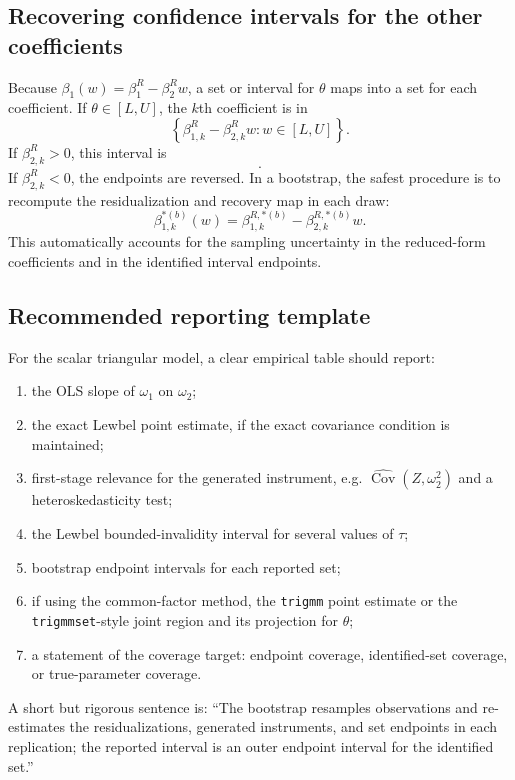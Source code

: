 \documentclass[11pt]{article}
\newcommand{\Cov}{\operatorname{Cov}}
\theoremstyle{plain}
\theoremstyle{definition}
\theoremstyle{remark}
\begin{document}
\subsection{Recovering confidence intervals for the other coefficients}
\label{subsec:other-coefficients-inference}

Because $\beta_1(w)=\beta_1^R-\beta_2^Rw$, a set or interval for $\theta$ maps
into a set for each coefficient.  If $\theta\in[L,U]$, the $k$th coefficient is
in
\begin{equation}
\left\{\beta_{1,k}^R-\beta_{2,k}^R w:w\in[L,U]\right\}.
\end{equation}
If $\beta_{2,k}^R>0$, this interval is
\begin{equation}
[\beta_{1,k}^R-\beta_{2,k}^R U,
 \beta_{1,k}^R-\beta_{2,k}^R L].
\end{equation}
If $\beta_{2,k}^R<0$, the endpoints are reversed.  In a bootstrap, the safest
procedure is to recompute the residualization and recovery map in each draw:
\begin{equation}
\beta_{1,k}^{*(b)}(w)=
\beta_{1,k}^{R,*(b)}-\beta_{2,k}^{R,*(b)}w.
\end{equation}
This automatically accounts for the sampling uncertainty in the reduced-form
coefficients and in the identified interval endpoints.

\subsection{Recommended reporting template}
\label{subsec:reporting-template}

For the scalar triangular model, a clear empirical table should report:
\begin{enumerate}
    \item the OLS slope of $\omega_1$ on $\omega_2$;
    \item the exact Lewbel point estimate, if the exact covariance condition is
    maintained;
    \item first-stage relevance for the generated instrument, e.g.
    $\widehat{\Cov}(Z,\omega_2^2)$ and a heteroskedasticity test;
    \item the Lewbel bounded-invalidity interval for several values of $\tau$;
    \item bootstrap endpoint intervals for each reported set;
    \item if using the common-factor method, the \texttt{trigmm} point estimate
    or the \texttt{trigmmset}-style joint region and its projection for
    $\theta$;
    \item a statement of the coverage target: endpoint coverage, identified-set
    coverage, or true-parameter coverage.
\end{enumerate}
A short but rigorous sentence is: ``The bootstrap resamples observations and
re-estimates the residualizations, generated instruments, and set endpoints in
each replication; the reported interval is an outer endpoint interval for the
identified set.''
\end{document}
